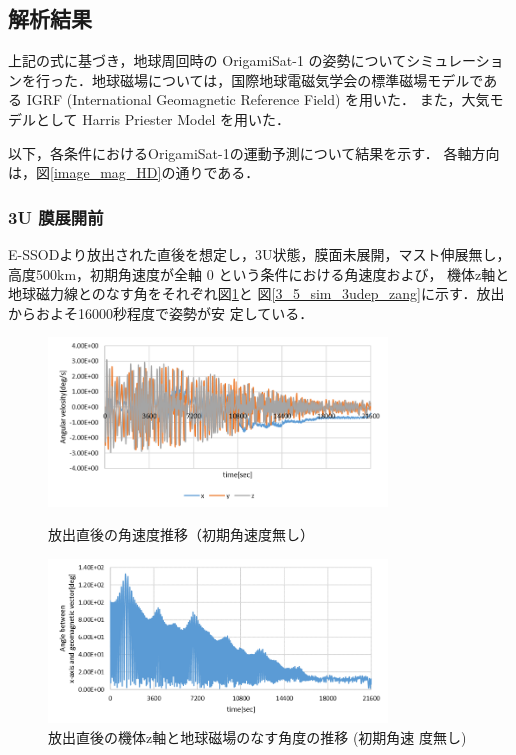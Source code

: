 \subsection{解析結果}
上記の式に基づき，地球周回時の OrigamiSat-1 の姿勢についてシミュレーショ
ンを行った．地球磁場については，国際地球電磁気学会の標準磁場モデルであ
る IGRF (International Geomagnetic Reference Field) を用いた．
また，大気モデルとして Harris Priester Model を用いた．

以下，各条件におけるOrigamiSat-1の運動予測について結果を示す．
各軸方向は，図\ref{image_mag_HD}の通りである．

\subsubsection{3U 膜展開前}
E-SSODより放出された直後を想定し，3U状態，膜面未展開，マスト伸展無し，
高度500km，初期角速度が全軸 0 という条件における角速度および，
機体z軸と地球磁力線とのなす角をそれぞれ図\ref{3_5_sim_3udep_angvel}と
図\ref{3_5_sim_3udep_zang}に示す．放出からおよそ16000秒程度で姿勢が安
定している．

\begin{figure}[htbp]
	\centering
	\includegraphics[width=9cm]{./03/fig/3_5_sim_3udep_angvel.png}
	\caption{放出直後の角速度推移（初期角速度無し）}
	\label{3_5_sim_3udep_angvel}
	\centering
	\includegraphics[width=9cm]{./03/fig/3_5_sim_3udep_zang.png}
	\caption{放出直後の機体z軸と地球磁場のなす角度の推移 (初期角速
          度無し)}
	\label{3_5_sim_3udep_angvel}
\end{figure}

